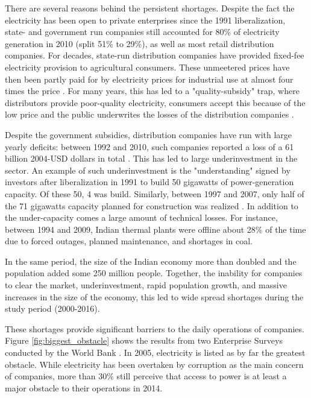 \documentclass[11pt]{article}
\begin{document}
There are several reasons behind the persistent shortages. Despite the fact the electricity has been open to private enterprises since the 1991 liberalization, state- and government run companies still accounted for 80\% of electricity generation in 2010 (split 51\% to 29\%), as well as most retail distribution companies. For decades, state-run distribution companies have provided fixed-fee electricity provision to agricultural consumers. These unmeetered prices have then been partly paid for by electricity prices for industrial use at almost four times the price \citep{allcott_how_2016}. For many years, this has led to a "quality-subsidy" trap, where distributors provide poor-quality electricity, consumers accept this because of the low price and the public underwrites the losses of the distribution companies \citep{mcrae_infrastructure_2015}. 

Despite the government subsidies, distribution companies have run with large yearly deficits: between 1992 and 2010, such companies reported a loss of a 61 billion 2004-USD dollars in total \citep{allcott_how_2016}. This has led to large underinvestment in the sector. An example of such underinvestment is the "understanding" signed by investors after liberalization in 1991 to build 50 gigawatts of power-generation capacity. Of these 50, 4 was build. Similarly, between 1997 and 2007, only half of the 71 gigawatts capacity planned for construction was realized \citep{cea_planwise_2013}. In addition to the under-capacity comes a large amount of technical losses. For instance, between 1994 and 2009, Indian thermal plants were offline about 28\% of the time due to forced outages, planned maintenance, and shortages in coal. 

In the same period, the size of the Indian economy more than doubled and the population added some 250 million people. Together, the inability for companies to clear the market, underinvestment, rapid population growth, and massive increases in the size of the economy, this led to wide spread shortages during the study period (2000-2016). 

These shortages provide significant barriers to the daily operations of companies. Figure \ref{fig:biggest_obstacle} shows the results from two Enterprise Surveys conducted by the World Bank \citep{world_bank_enterprise_2020-1,world_bank_enterprise_2020-2}. In 2005, electricity is listed as by far the greatest obstacle. While electricity has been overtaken by corruption as the main concern of companies, more than 30\% still perceive that access to power is at least a major obstacle to their operations in 2014.
\end{document}
